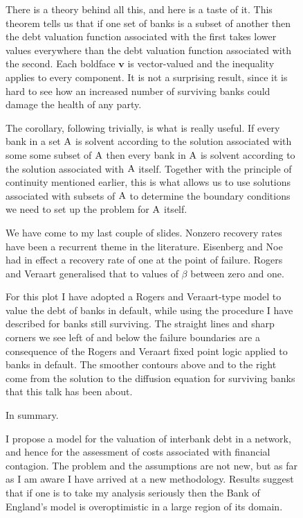 \documentclass[a4paper,11pt]{article}
\newcommand{\vv}{\boldsymbol{v}}
\newcommand{\sA}{\textup{A}}
\begin{document}
  \begin{figure}[H]
    \begin{center}
    \end{center}
    \ttfamily
    There is a theory behind all this, and here is a taste of it.
    This theorem tells us that if one set of banks is a subset of another
    then the debt valuation function associated with the first takes lower values everywhere than the debt valuation function associated with the second.
    Each boldface $\vv$ is vector-valued and the inequality applies to every component.
    It is not a surprising result, since it is hard to see how an increased number of surviving banks could damage the health of any party.

    The corollary, following trivially, is what is really useful.
    If every bank in a set $\sA$ is solvent according to the solution associated with some some subset of $\sA$
    then every bank in $\sA$ is solvent according to the solution associated with $\sA$ itself.
    Together with the principle of continuity mentioned earlier,
    this is what allows us to use solutions associated with subsets of $\sA$ to determine
    the boundary conditions we need to set up the problem for $\sA$ itself.
  \end{figure}
  \begin{figure}[H]
    \begin{center}
    \end{center}
    \ttfamily
    We have come to my last couple of slides.
    Nonzero recovery rates have been a recurrent theme in the literature.
    Eisenberg and Noe had in effect a recovery rate of one at the point of failure.
    Rogers and Veraart generalised that to values of $\beta$ between zero and one.

    For this plot I have adopted a Rogers and Veraart-type model to value the debt of banks in default,
    while using the procedure I have described for banks still surviving.
    The straight lines and sharp corners we see left of and below the failure boundaries
    are a consequence of the Rogers and Veraart fixed point logic applied to banks in default.
    The smoother contours above and to the right come from
    the solution to the diffusion equation for surviving banks that this talk has been about.
  \end{figure}
  \begin{figure}[H]
    \begin{center}
    \end{center}
    \ttfamily
    In summary.

    I propose a model for the valuation of interbank debt in a network,
    and hence for the assessment of costs associated with financial contagion.
    The problem and the assumptions are not new,
    but as far as I am aware I have arrived at a new methodology.
    Results suggest that if one is to take my analysis seriously then the
    Bank of England's model is overoptimistic in a large region of its domain.
  \end{figure}
\end{document}
